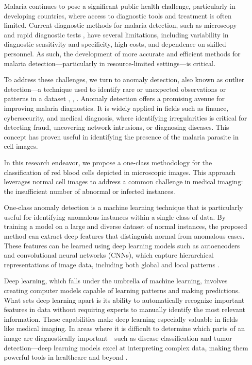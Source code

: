 \documentclass[journal,12pt,onecolumn,draftcls]{IEEEtran}
\begin{document}
Malaria continues to pose a significant public health challenge, particularly in developing countries, where access to diagnostic tools and treatment is often limited. Current diagnostic methods for malaria detection, such as microscopy and rapid diagnostic tests \cite{wilson2012}, have several limitations, including variability in diagnostic sensitivity and specificity, high costs, and dependence on skilled personnel. As such, the development of more accurate and efficient methods for malaria detection—particularly in resource-limited settings—is critical.

To address these challenges, we turn to anomaly detection, also known as outlier detection—a technique used to identify rare or unexpected observations or patterns in a dataset \cite{chandola2009}, \cite{ruff2021}, \cite{edgeworth1887}. Anomaly detection offers a promising avenue for improving malaria diagnostics. It is widely applied in fields such as finance, cybersecurity, and medical diagnosis, where identifying irregularities is critical for detecting fraud, uncovering network intrusions, or diagnosing diseases. This concept has proven useful in identifying the presence of the malaria parasite in cell images.

In this research endeavor, we propose a one-class methodology for the classification of red blood cells depicted in microscopic images. This approach leverages normal cell images to address a common challenge in medical imaging: the insufficient number of abnormal or infected instances.

One-class anomaly detection is a machine learning technique that is particularly useful for identifying anomalous instances within a single class of data. By training a model on a large and diverse dataset of normal instances, the proposed method can extract deep features that distinguish normal from anomalous cases. These features can be learned using deep learning models such as autoencoders and convolutional neural networks (CNNs), which capture hierarchical representations of image data, including both global and local patterns \cite{torres2021}.

Deep learning, which falls under the umbrella of machine learning, involves creating computer models capable of learning patterns and making predictions. What sets deep learning apart is its ability to automatically recognize important features in data without requiring experts to manually identify the most relevant information. These capabilities make deep learning especially valuable in fields like medical imaging. In areas where it is difficult to determine which parts of an image are diagnostically important—such as disease classification and tumor detection—deep learning models excel at interpreting complex data, making them powerful tools in healthcare and beyond \cite{torres2021}.
\end{document}
